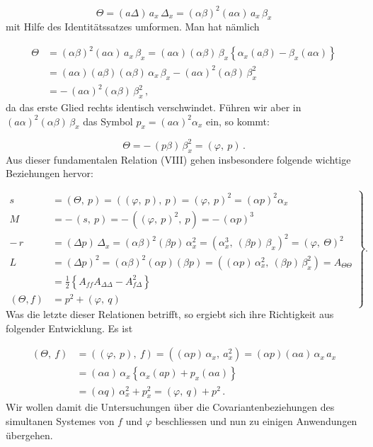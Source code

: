 \documentclass[11pt]{article}
\providecommand{\weberpage}[1]{}
\providecommand{\weq}[2]{\begin{equation}\tag{#1}#2\end{equation}}
\let\Delta\varDelta
\let\Theta\varTheta
\begin{document}
\[
\Theta = (a\Delta)\,a_x\,\Delta_x = (\alpha\beta)^2(a\alpha)\,a_x\,\beta_x
\]
mit Hilfe des Identitätssatzes umformen. Man hat nämlich

\[
\begin{aligned}
\Theta &= (\alpha\beta)^2(a\alpha)\,a_x\,\beta_x = (a\alpha)(\alpha\beta)\,\beta_x\left\{\alpha_x(a\beta) - \beta_x(a\alpha)\right\}\\
&= (a\alpha)(a\beta)(\alpha\beta)\,\alpha_x\,\beta_x - (a\alpha)^2(\alpha\beta)\,\beta_x^2\\
&= -\,(a\alpha)^2(\alpha\beta)\,\beta_x^2\,,
\end{aligned}
\]
da das erste Glied rechts identisch verschwindet. Führen wir aber in
$(a\alpha)^2(\alpha\beta)\,\beta_x$ das Symbol $p_x = (a\alpha)^2\alpha_x$
ein, so kommt:

\[
\Theta = -\,(p\beta)\,\beta_x^2 = (\varphi,\ p)\,.
\]
Aus dieser fundamentalen Relation (VIII) gehen insbesondere folgende
wichtige Beziehungen hervor:


\weberpage{327}
\weq{IX}{\left.\begin{aligned}
s &= (\Theta,\ p) = ((\varphi,\ p),\ p) = (\varphi,\ p)^2 = (\alpha p)^2\alpha_x\\
M &= -\,(s,\ p) = -\,((\varphi,\ p)^2,\ p) = -\,(\alpha p)^3\\
-\,r &= (\Delta p)\,\Delta_x = (\alpha\beta)^2(\beta p)\,\alpha_x^2 = (\alpha_x^3,\ (\beta p)\,\beta_x)^2 = (\varphi,\ \Theta)^2\\
L &= (\Delta p)^2 = (\alpha\beta)^2(\alpha p)(\beta p) = ((\alpha p)\,\alpha_x^2,\ (\beta p)\,\beta_x^2) = A_{\Theta\Theta}\\
&= \tfrac{1}{2}\left\{A_{ff}A_{\Delta\Delta} - A_{f\Delta}^2\right\}\\
(\Theta,f) &= p^2 + (\varphi,\ q)
\end{aligned}\right\}.}
Was die letzte dieser Relationen betrifft, so ergiebt sich ihre
Richtigkeit aus folgender Entwicklung. Es ist

\[
\begin{aligned}
(\Theta,\ f) &= ((\varphi,\ p),\ f) = ((\alpha p)\,\alpha_x,\ a_x^2) = (\alpha p)(\alpha a)\,\alpha_x\,a_x\\
&= (\alpha a)\,\alpha_x\left\{\alpha_x(ap) + p_x(\alpha a)\right\}\\
&= (\alpha q)\,\alpha_x^2 + p_x^2 = (\varphi,\ q) + p^2\,.
\end{aligned}
\]
Wir wollen damit die Untersuchungen über die Covariantenbeziehungen des
simultanen Systemes von $f$ und $\varphi$ beschliessen und nun zu einigen
Anwendungen übergehen.
\end{document}
